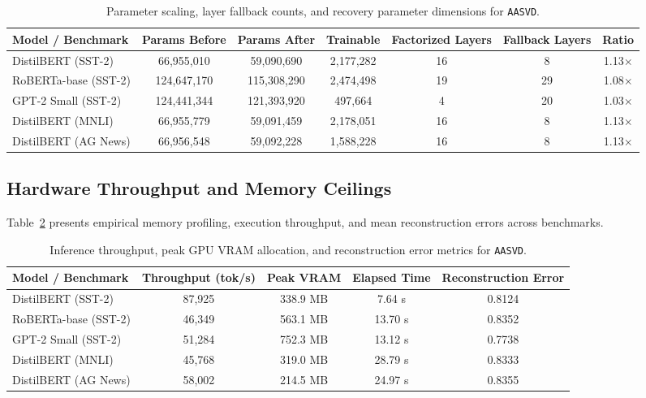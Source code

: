 \begin{table}[t]
\centering
\small
\begin{tabular}{lcccccc}
\toprule
\textbf{Model / Benchmark} & \textbf{Params Before} & \textbf{Params After} & \textbf{Trainable} & \textbf{Factorized Layers} & \textbf{Fallback Layers} & \textbf{Ratio} \\
\midrule
DistilBERT (SST-2) & 66,955,010 & 59,090,690 & 2,177,282 & 16 & 8 & 1.13$\times$ \\
RoBERTa-base (SST-2) & 124,647,170 & 115,308,290 & 2,474,498 & 19 & 29 & 1.08$\times$ \\
GPT-2 Small (SST-2) & 124,441,344 & 121,393,920 & 497,664 & 4 & 20 & 1.03$\times$ \\
DistilBERT (MNLI) & 66,955,779 & 59,091,459 & 2,178,051 & 16 & 8 & 1.13$\times$ \\
DistilBERT (AG News) & 66,956,548 & 59,092,228 & 1,588,228 & 16 & 8 & 1.13$\times$ \\
\bottomrule
\end{tabular}
\caption{Parameter scaling, layer fallback counts, and recovery parameter dimensions for \texttt{AASVD}.}
\label{tab:results_params_aasvdcompressor}
\end{table}

\subsection{Hardware Throughput and Memory Ceilings}
Table~\ref{tab:results_vram_aasvdcompressor} presents empirical memory profiling, execution throughput, and mean reconstruction errors across benchmarks.

\begin{table}[t]
\centering
\small
\begin{tabular}{lcccc}
\toprule
\textbf{Model / Benchmark} & \textbf{Throughput (tok/s)} & \textbf{Peak VRAM} & \textbf{Elapsed Time} & \textbf{Reconstruction Error} \\
\midrule
DistilBERT (SST-2) & 87,925 & 338.9 MB & 7.64 s & 0.8124 \\
RoBERTa-base (SST-2) & 46,349 & 563.1 MB & 13.70 s & 0.8352 \\
GPT-2 Small (SST-2) & 51,284 & 752.3 MB & 13.12 s & 0.7738 \\
DistilBERT (MNLI) & 45,768 & 319.0 MB & 28.79 s & 0.8333 \\
DistilBERT (AG News) & 58,002 & 214.5 MB & 24.97 s & 0.8355 \\
\bottomrule
\end{tabular}
\caption{Inference throughput, peak GPU VRAM allocation, and reconstruction error metrics for \texttt{AASVD}.}
\label{tab:results_vram_aasvdcompressor}
\end{table}

